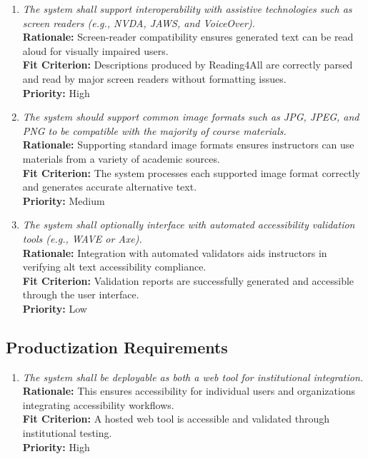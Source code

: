\documentclass[12pt]{article}
\begin{document}
\begin{enumerate}[label=OER-IAS\arabic*., wide=0pt, leftmargin=*]
  \item \emph{The system shall support interoperability with
      assistive technologies such as screen readers (e.g., NVDA, JAWS,
    and VoiceOver).}\\[2mm]
    {\bf Rationale:} Screen-reader compatibility ensures generated
    text can be read aloud for visually impaired users.\\
    {\bf Fit Criterion:} Descriptions produced by Reading4All are
    correctly parsed and read by major screen readers without
    formatting issues.\\
    {\bf Priority:} High

  \item \emph{The system should support common image formats such as JPG, JPEG, and PNG to be compatible with the majority of course materials.}\\[2mm]
    {\bf Rationale:} Supporting standard image formats ensures instructors can use materials from a variety of academic sources.\\
    {\bf Fit Criterion:} The system processes each supported image format correctly and generates accurate alternative text.\\
    {\bf Priority:} Medium

  \item \emph{The system shall optionally interface with automated
    accessibility validation tools (e.g., WAVE or Axe).}\\[2mm]
    {\bf Rationale:} Integration with automated validators aids
    instructors in verifying alt text accessibility compliance.\\
    {\bf Fit Criterion:} Validation reports are successfully
    generated and accessible through the user interface.\\
    {\bf Priority:} Low
\end{enumerate}

\subsection{Productization Requirements}

\begin{enumerate}[label=OER-PR\arabic*., wide=0pt, leftmargin=*]
  \item \emph{The system shall be deployable as both a web
    tool for institutional integration.}\\[2mm]
    {\bf Rationale:} This ensures accessibility for
    individual users and organizations integrating accessibility workflows.\\
    {\bf Fit Criterion:} A hosted web tool is
    accessible and validated through institutional testing.\\
    {\bf Priority:} High
\end{enumerate}
\end{document}

